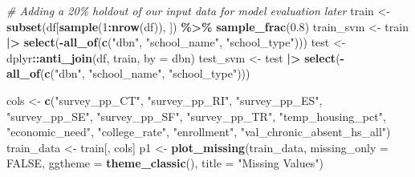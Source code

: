 \documentclass[
  man,floatsintext]{apa6}
\newenvironment{Shaded}{\begin{snugshade}}{\end{snugshade}}
\newcommand{\AttributeTok}[1]{\textcolor[rgb]{0.13,0.29,0.53}{#1}}
\newcommand{\CommentTok}[1]{\textcolor[rgb]{0.56,0.35,0.01}{\textit{#1}}}
\newcommand{\ConstantTok}[1]{\textcolor[rgb]{0.56,0.35,0.01}{#1}}
\newcommand{\DecValTok}[1]{\textcolor[rgb]{0.00,0.00,0.81}{#1}}
\newcommand{\FloatTok}[1]{\textcolor[rgb]{0.00,0.00,0.81}{#1}}
\newcommand{\FunctionTok}[1]{\textcolor[rgb]{0.13,0.29,0.53}{\textbf{#1}}}
\newcommand{\NormalTok}[1]{#1}
\newcommand{\OtherTok}[1]{\textcolor[rgb]{0.56,0.35,0.01}{#1}}
\newcommand{\SpecialCharTok}[1]{\textcolor[rgb]{0.81,0.36,0.00}{\textbf{#1}}}
\newcommand{\StringTok}[1]{\textcolor[rgb]{0.31,0.60,0.02}{#1}}
\begin{document}
\begin{Shaded}
\begin{Highlighting}[]
\CommentTok{\# Adding a 20\% holdout of our input data for model evaluation later}
\NormalTok{train }\OtherTok{\textless{}{-}} \FunctionTok{subset}\NormalTok{(df[}\FunctionTok{sample}\NormalTok{(}\DecValTok{1}\SpecialCharTok{:}\FunctionTok{nrow}\NormalTok{(df)), ]) }\SpecialCharTok{\%\textgreater{}\%} \FunctionTok{sample\_frac}\NormalTok{(}\FloatTok{0.8}\NormalTok{)}
\NormalTok{train\_svm }\OtherTok{\textless{}{-}}\NormalTok{ train }\SpecialCharTok{|\textgreater{}} \FunctionTok{select}\NormalTok{(}\SpecialCharTok{{-}}\FunctionTok{all\_of}\NormalTok{(}\FunctionTok{c}\NormalTok{(}\StringTok{"dbn"}\NormalTok{, }\StringTok{"school\_name"}\NormalTok{, }\StringTok{"school\_type"}\NormalTok{)))}
\NormalTok{test  }\OtherTok{\textless{}{-}}\NormalTok{ dplyr}\SpecialCharTok{::}\FunctionTok{anti\_join}\NormalTok{(df, train, }\AttributeTok{by =} \StringTok{\textquotesingle{}dbn\textquotesingle{}}\NormalTok{)}
\NormalTok{test\_svm }\OtherTok{\textless{}{-}}\NormalTok{ test }\SpecialCharTok{|\textgreater{}} \FunctionTok{select}\NormalTok{(}\SpecialCharTok{{-}}\FunctionTok{all\_of}\NormalTok{(}\FunctionTok{c}\NormalTok{(}\StringTok{"dbn"}\NormalTok{, }\StringTok{"school\_name"}\NormalTok{, }\StringTok{"school\_type"}\NormalTok{)))}

\NormalTok{cols }\OtherTok{\textless{}{-}} \FunctionTok{c}\NormalTok{(}\StringTok{"survey\_pp\_CT"}\NormalTok{, }\StringTok{"survey\_pp\_RI"}\NormalTok{,}
          \StringTok{"survey\_pp\_ES"}\NormalTok{, }\StringTok{"survey\_pp\_SE"}\NormalTok{,}
          \StringTok{"survey\_pp\_SF"}\NormalTok{, }\StringTok{"survey\_pp\_TR"}\NormalTok{,}
          \StringTok{"temp\_housing\_pct"}\NormalTok{, }\StringTok{"economic\_need"}\NormalTok{,}
          \StringTok{"college\_rate"}\NormalTok{, }\StringTok{"enrollment"}\NormalTok{,}
          \StringTok{"val\_chronic\_absent\_hs\_all"}\NormalTok{)}
\NormalTok{train\_data }\OtherTok{\textless{}{-}}\NormalTok{ train[, cols]}
\NormalTok{p1 }\OtherTok{\textless{}{-}} \FunctionTok{plot\_missing}\NormalTok{(train\_data, }\AttributeTok{missing\_only =} \ConstantTok{FALSE}\NormalTok{,}
                   \AttributeTok{ggtheme =} \FunctionTok{theme\_classic}\NormalTok{(), }\AttributeTok{title =} \StringTok{"Missing Values"}\NormalTok{)}


\end{Highlighting}
\end{Shaded}
\end{document}
